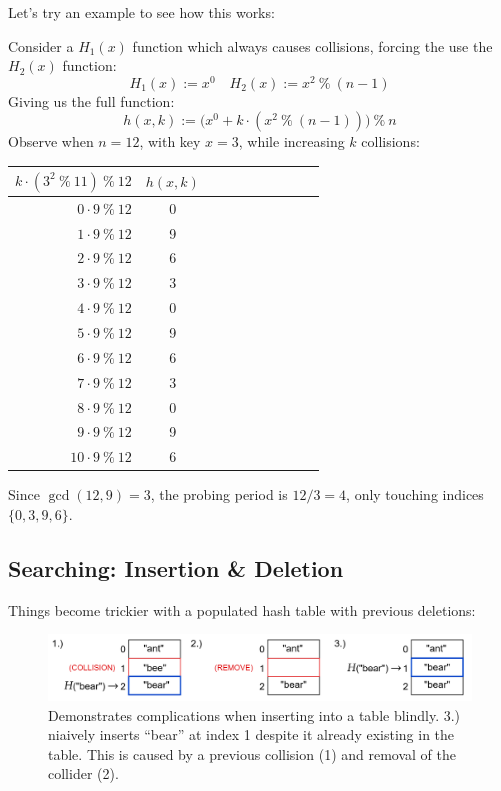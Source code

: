 \newpage 
\noindent
Let's try an example to see how this works:

\begin{Example}

    Consider a $H_1(x)$ function which always causes collisions, forcing the use the $H_2(x)$ function:
    \[
        H_1(x) := x^0 \quad H_2(x) := x^2\ \%\ (n-1)
    \]
    \noindent
    Giving us the full function:
    \[
    h(x,k) := \bigl(x^0 + k \cdot \left(x^2\ \%\ (n-1)\right)\bigr)\ \%\ n
    \]
    Observe when $n=12$, with key $x=3$, while increasing $k$ collisions:

    \begin{center}
    
 
    \setlength{\tabcolsep}{3pt}
\renewcommand{\arraystretch}{1.1}
\begin{tabular}{r|*{9}{c}}
    \multicolumn{1}{c|}{$
      k \cdot (3^2\ \%\ 11)\ \%\ 12
    $}
      & $h(x,k)$ \\
    \hline
    $0 \cdot 9\ \%\ 12$  & 0 \\
    $1 \cdot 9\ \%\ 12$  & 9   \\
    $2 \cdot 9\ \%\ 12$  & 6   \\
    $3 \cdot 9\ \%\ 12$  & 3   \\
    $4 \cdot 9\ \%\ 12$  & 0   \\
    $5 \cdot 9\ \%\ 12$  & 9   \\
    $6 \cdot 9\ \%\ 12$  & 6   \\
    $7 \cdot 9\ \%\ 12$  & 3   \\
    $8 \cdot 9\ \%\ 12$  & 0   \\
    $9 \cdot 9\ \%\ 12$  & 9   \\
    $10 \cdot 9\ \%\ 12$ & 6   \\
\end{tabular}
     \end{center}
\noindent
Since $\gcd(12, 9) = 3$, the probing period is $12/3 = 4$, only touching indices 
$\{0,3,9,6\}$.

\end{Example}

\subsection{Searching: Insertion \& Deletion}
Things become trickier with a populated hash table with previous 
deletions:

\begin{figure}[ht!]
    \centering
    \includegraphics[width=\textwidth]{./Sections/hash/delete.png}
    \caption{Demonstrates complications when inserting into a table blindly. 3.) niaively inserts ``bear'' at index
    1 despite it already existing in the table. This is caused by a previous collision (1) and removal of the collider (2).}
    \label{fig:delete}
\end{figure}

